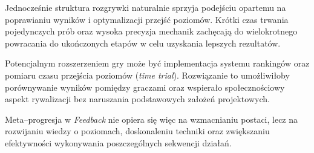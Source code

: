 \documentclass[11pt,a4paper]{article}
\begin{document}
Jednocześnie struktura rozgrywki naturalnie sprzyja podejściu opartemu na poprawianiu wyników i optymalizacji przejść poziomów. Krótki czas trwania pojedynczych prób oraz wysoka precyzja mechanik zachęcają do wielokrotnego powracania do ukończonych etapów w celu uzyskania lepszych rezultatów.

Potencjalnym rozszerzeniem gry może być implementacja systemu rankingów oraz pomiaru czasu przejścia poziomów (\textit{time trial}). Rozwiązanie to umożliwiłoby porównywanie wyników pomiędzy graczami oraz wspierało społecznościowy aspekt rywalizacji bez naruszania podstawowych założeń projektowych.

Meta--progresja w \textit{Feedback} nie opiera się więc na wzmacnianiu postaci, lecz na rozwijaniu wiedzy o poziomach, doskonaleniu techniki oraz zwiększaniu efektywności wykonywania poszczególnych sekwencji działań.


\end{document}
